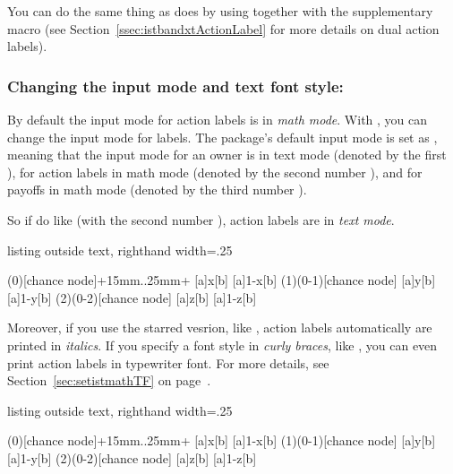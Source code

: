 You can do the same thing as \cmd{\istB} does by using \cmd{\istb} together with the supplementary macro \cmd{\xtActionLabel} (see Section~\ref{ssec:istbandxtActionLabel} for more details on dual action labels).

\subsubsection{Changing the input mode and text font style: \protect\cmd{\setistmathTF(*)}}
\label{ssec:setistmathTF-actionlabels}

By default the input mode for action labels is in \emph{math mode}. With \icmd{\setistmathTF}, you can change the input mode for labels. The package's default input mode is set as , meaning that the input mode for an owner is in text mode (denoted by the first ), for action labels in math mode (denoted by the second number ), and for payoffs in math mode (denoted by the third number ).

So if do like  (with the second number ), action labels are in \emph{text mode}. 

\begin{tcblisting}{listing outside text, righthand width=.25\linewidth}
\begin{istgame}[sloped,font=\footnotesize]
\istroot(0)[chance node]+15mm..25mm+
  [a]{x}[b] [a]{1-x}[b] \endist
{}         %
\istroot(1)(0-1)[chance node]
  [a]{y}[b] [a]{1-y}[b] \endist
\istroot(2)(0-2)[chance node]
  [a]{z}[b] [a]{1-z}[b] \endist
\end{istgame}
\end{tcblisting}

Moreover, if you use the starred vesrion, like \icmd{\setistmathTF*}, action labels automatically are printed in \emph{italics}. 
If you specify a font style in \emph{curly braces}, like , you can even print action labels in typewriter font.
For more details, see Section~\ref{sec:setistmathTF} on page~\pageref{sec:setistmathTF}.

\begin{tcblisting}{listing outside text, righthand width=.25\linewidth}
\begin{istgame}[sloped,font=\footnotesize]
\istroot(0)[chance node]+15mm..25mm+
  [a]{x}[b] [a]{1-x}[b] \endist
{}         %
\istroot(1)(0-1)[chance node]
  [a]{y}[b] [a]{1-y}[b] \endist
{} %
\istroot(2)(0-2)[chance node]
  [a]{z}[b] [a]{1-z}[b] \endist
\end{istgame}
\end{tcblisting}


